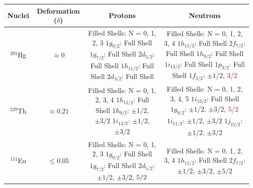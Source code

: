 \documentclass[8pt,a4paper, twoside]{report}
\begin{document}
\begin{table}[htbp]
\center
\begin{tabular}{c|c|c|c}
\toprule
\toprule
Nuclei     & Deformation ($\delta$) & Protons & Neutrons \\
\midrule
$^{201}$Hg & $\approx 0$
    &  \pbox{20cm}{Filled Shells: N = 0, 1, 2, 3 \\
    $1g_{9/2}$: Full Shell \\
    $1g_{7/2}$: Full Shell \\
    $2d_{5/2}$: Full Shell \\
    $1h_{11/2}$: Full Shell \\
    $2d_{3/2}$: Full Shell}              
    &  \pbox{20cm}{Filled Shells: N = 0, 1, 2, 3, 4 \\
    $1h_{11/2}$: Full Shell \\
    $2f_{7/2}$: Full Shell \\
    $1h_{9/2}$: Full Shell \\
    $1i_{13/2}$: Full Shell \\
    $1p_{3/2}$: Full Shell \\
    $1f_{5/2}$: $\pm 1/2$, \textcolor{red}{3/2}} \\
\midrule
$^{229}$Th & $\approx 0.21$
    &  \pbox{20cm}{Filled Shells: N = 0, 1, 2, 3, 4 \\
    $1h_{11/2}$: Full Shell \\
    $1h_{9/2}$: $\pm 1/2$, $\pm 3/2$ \\
    $1i_{13/2}$: $\pm 1/2$, $\pm 3/2$}              
    &  \pbox{20cm}{Filled Shells: N = 0, 1, 2, 3, 4, 5 \\
    $1i_{13/2}$: Full Shell \\
    $1g_{9/2}$: $\pm 1/2$, $\pm 3/2$, $\textcolor{red}{5/2}$ \\
    $1i_{11/2}$: $\pm 1/2$, $\pm 3/2$ \\
    $1j_{15/2}$: $\pm 1/2$, $\pm 3/2$} \\
\midrule
$^{151}$Eu & $\leq 0.05$
    &  \pbox{20cm}{Filled Shells: N = 0, 1, 2, 3 \\
    $1g_{9/2}$: Full Shell \\
    $1g_{7/2}$: Full Shell \\
    $2d_{5/2}$: $\pm 1/2$, $\pm 3/2$, $\textcolor{blue}{5/2}$ }          
    &  \pbox{20cm}{Filled Shells: N = 0, 1, 2, 3, 4 \\
    $1h_{11/2}$: Full Shell \\
    $2f_{7/2}$:$\pm 1/2$, $\pm 3/2$, $\pm 5/2$} \\

\end{tabular}
\end{table}
\end{document}
